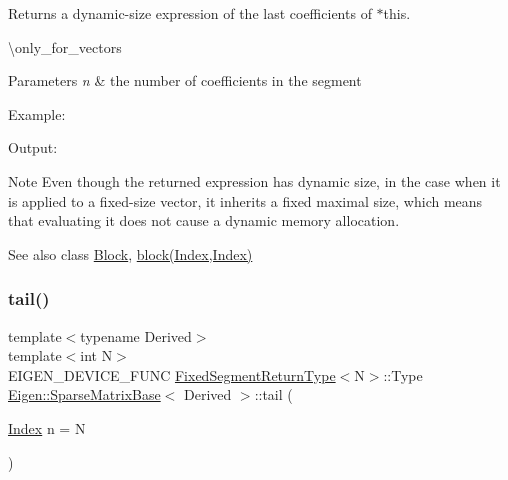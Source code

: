 \begin{DoxyReturn}{Returns}
a dynamic-\/size expression of the last coefficients of $\ast$this.
\end{DoxyReturn}
\textbackslash{}only\+\_\+for\+\_\+vectors


\begin{DoxyParams}{Parameters}
{\em n} & the number of coefficients in the segment\\
\hline
\end{DoxyParams}
Example\+: 
\begin{DoxyCodeInclude}{0}
\end{DoxyCodeInclude}
 Output\+: 
\begin{DoxyVerbInclude}
\end{DoxyVerbInclude}


\begin{DoxyNote}{Note}
Even though the returned expression has dynamic size, in the case when it is applied to a fixed-\/size vector, it inherits a fixed maximal size, which means that evaluating it does not cause a dynamic memory allocation.
\end{DoxyNote}
\begin{DoxySeeAlso}{See also}
class \mbox{\hyperlink{class_eigen_1_1_block}{Block}}, \mbox{\hyperlink{class_eigen_1_1_sparse_matrix_base_ad7a342adc59c2866c323ace6d2f65378}{block(\+Index,\+Index)}} 
\end{DoxySeeAlso}
\mbox{\label{class_eigen_1_1_sparse_matrix_base_a4c210c4ddf80da455aaec0ab31093737}} 
\subsubsection{\texorpdfstring{tail()}{tail()}\hspace{0.1cm}{\footnotesize\ttfamily [2/2]}}
{\footnotesize\ttfamily template$<$typename Derived$>$ \\
template$<$int N$>$ \\
E\+I\+G\+E\+N\+\_\+\+D\+E\+V\+I\+C\+E\+\_\+\+F\+U\+NC \mbox{\hyperlink{struct_eigen_1_1_sparse_matrix_base_1_1_fixed_segment_return_type}{Fixed\+Segment\+Return\+Type}}$<$N$>$\+::Type \mbox{\hyperlink{class_eigen_1_1_sparse_matrix_base}{Eigen\+::\+Sparse\+Matrix\+Base}}$<$ Derived $>$\+::tail (\begin{DoxyParamCaption}\item[{\mbox{\hyperlink{struct_eigen_1_1_eigen_base_a554f30542cc2316add4b1ea0a492ff02}{Index}}}]{n = {\ttfamily N} }\end{DoxyParamCaption})\hspace{0.3cm}{\ttfamily [inline]}}

